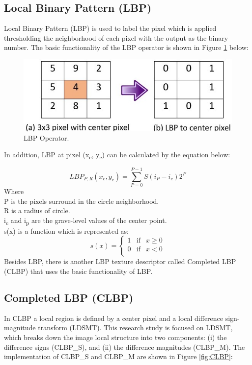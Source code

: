 \documentclass[review]{elsarticle}
\begin{document}
\subsection{Local Binary Pattern (LBP)}
\label{subsec:LBP}
Local Binary Pattern (LBP) \cite{Ojala1996} is used to label the pixel which is applied thresholding the neighborhood of each pixel with the output as the binary number. The basic functionality of the LBP operator is shown in Figure \ref{fig:LBP} below:

\begin{figure}[h]
	\centering
	\includegraphics[width=0.6\linewidth]{pic/fig2}
	\caption{LBP Operator.}
	\label{fig:LBP}
\end{figure}
In addition, LBP at pixel (x\textsubscript{c}, y\textsubscript{c}) can be calculated by the equation below:

\begin{equation}
LBP_{P,R} (x_c,y_c) = \sum_{P=0}^{P-1} S(i_P - i_c)2^P
\end{equation}
Where \\ 
P is the pixels surround in the circle neighborhood. \\
R is a radius of circle. \\
i\textsubscript{c}  and i\textsubscript{p}  are the grave-level values of the center point. \\
s(x) is a function which is represented as: \\
\begin{equation}
s(x) = \left\{ \begin{array}{rcl}
1 & \mbox{if}
& x\geq0 \\ 0 & \mbox{if} & x <0 \\

\end{array}\right.
\end{equation}
Besides LBP, there is another LBP texture descriptor called Completed LBP (CLBP) that uses the basic functionality of LBP.

\subsection{Completed LBP (CLBP)}
\label{subsec:CLBP}
In CLBP \cite{Guo2010} a local region is defined by a center pixel and a local difference sign-magnitude transform (LDSMT). This research study is focused on LDSMT, which breaks down the image local structure into two components: (i) the difference signs (CLBP\_S), and (ii) the difference magnitudes (CLBP\_M). The implementation of CLBP\_S and CLBP\_M are shown in Figure \ref{fig:CLBP}: 
\end{document}
